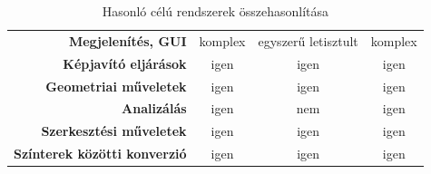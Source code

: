 \documentclass[a4paper,12pt,oneside]{report}
\begin{document}
\begin{landscape}
\begin{table}[h]
\begin{tabular}{@{}rccc@{}}
\textbf{Megjelenítés, GUI} & komplex & egyszerű letisztult & komplex \\
\textbf{Képjavító eljárások} & igen & igen & igen \\
\textbf{Geometriai műveletek} & igen & igen & igen \\
\textbf{Analizálás} & igen & nem & igen \\
\textbf{Szerkesztési műveletek} & igen & igen & igen \\
\textbf{Színterek közötti konverzió} & igen & igen & igen \\ \bottomrule
\end{tabular}
\caption{Hasonló célú rendszerek összehasonlítása}
\label{table:diff_soft}

\end{table} 
\end{landscape}
\end{document}
